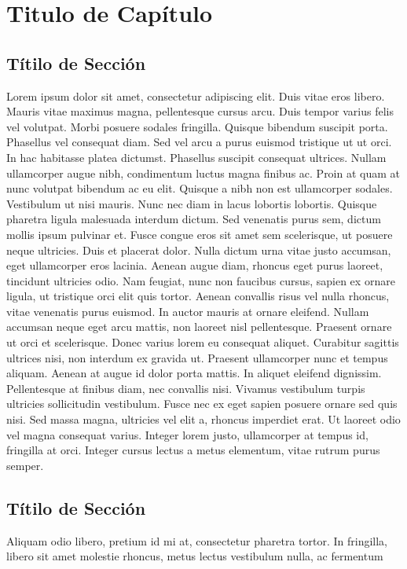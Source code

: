 \chapter{Titulo de Capítulo} 
\section{Títilo de Sección} Lorem ipsum dolor sit
amet, consectetur adipiscing elit. Duis vitae eros libero. Mauris vitae maximus
magna, pellentesque cursus arcu. Duis tempor varius felis vel volutpat. Morbi
posuere sodales fringilla. Quisque bibendum suscipit porta. Phasellus vel
consequat diam. Sed vel arcu a purus euismod tristique ut ut orci. In hac
habitasse platea dictumst. Phasellus suscipit consequat ultrices. Nullam
ullamcorper augue nibh, condimentum luctus magna finibus ac. Proin at quam at
nunc volutpat bibendum ac eu elit. Quisque a nibh non est ullamcorper sodales.
Vestibulum ut nisi mauris. Nunc nec diam in lacus lobortis lobortis. Quisque
pharetra ligula malesuada interdum dictum. Sed venenatis purus sem, dictum
mollis ipsum pulvinar et. Fusce congue eros sit amet sem scelerisque, ut posuere
neque ultricies. Duis et placerat dolor. Nulla dictum urna vitae justo accumsan,
eget ullamcorper eros lacinia. Aenean augue diam, rhoncus eget purus laoreet,
tincidunt ultricies odio. Nam feugiat, nunc non faucibus cursus, sapien ex
ornare ligula, ut tristique orci elit quis tortor. Aenean convallis risus vel
nulla rhoncus, vitae venenatis purus euismod. In auctor mauris at ornare
eleifend. Nullam accumsan neque eget arcu mattis, non laoreet nisl pellentesque.
Praesent ornare ut orci et scelerisque. Donec varius lorem eu consequat aliquet.
Curabitur sagittis ultrices nisi, non interdum ex gravida ut. Praesent
ullamcorper nunc et tempus aliquam. Aenean at augue id dolor porta mattis. In
aliquet eleifend dignissim. Pellentesque at finibus diam, nec convallis nisi.
Vivamus vestibulum turpis ultricies sollicitudin vestibulum. Fusce nec ex eget
sapien posuere ornare sed quis nisi. Sed massa magna, ultricies vel elit a,
rhoncus imperdiet erat. Ut laoreet odio vel magna consequat varius. Integer
lorem justo, ullamcorper at tempus id, fringilla at orci. Integer cursus lectus
a metus elementum, vitae rutrum purus semper. \section{Títilo de Sección}
Aliquam odio libero, pretium id mi at, consectetur pharetra tortor. In fringilla,
libero sit amet molestie rhoncus, metus lectus vestibulum nulla, ac fermentum
